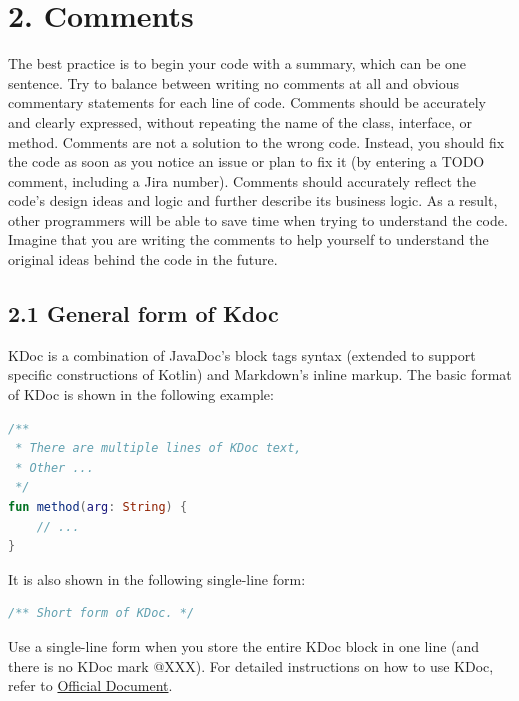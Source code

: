 \section*{\textbf{2. Comments}}
\label{sec:2.}
The best practice is to begin your code with a summary, which can be one sentence.
Try to balance between writing no comments at all and obvious commentary statements for each line of code.
Comments should be accurately and clearly expressed, without repeating the name of the class, interface, or method.
Comments are not a solution to the wrong code. Instead, you should fix the code as soon as you notice an issue or plan to fix it (by entering a TODO comment, including a Jira number).
Comments should accurately reflect the code's design ideas and logic and further describe its business logic.
As a result, other programmers will be able to save time when trying to understand the code.
Imagine that you are writing the comments to help yourself to understand the original ideas behind the code in the future.
\subsection*{\textbf{2.1 General form of Kdoc}}
\label{sec:2.1}
KDoc is a combination of JavaDoc's block tags syntax (extended to support specific constructions of Kotlin) and Markdown's inline markup.
The basic format of KDoc is shown in the following example:
\begin{lstlisting}[language=Kotlin]
 /**
 * There are multiple lines of KDoc text,
 * Other ...
 */
fun method(arg: String) {
    // ...
}
\end{lstlisting}
It is also shown in the following single-line form:
\begin{lstlisting}[language=Kotlin]
 /** Short form of KDoc. */
\end{lstlisting}
Use a single-line form when you store the entire KDoc block in one line (and there is no KDoc mark @XXX). For detailed instructions on how to use KDoc, refer to \href{https://docs.oracle.com/en/Kotlin/Kotlinse/11/tools/KDoc.html}{Official Document}.
